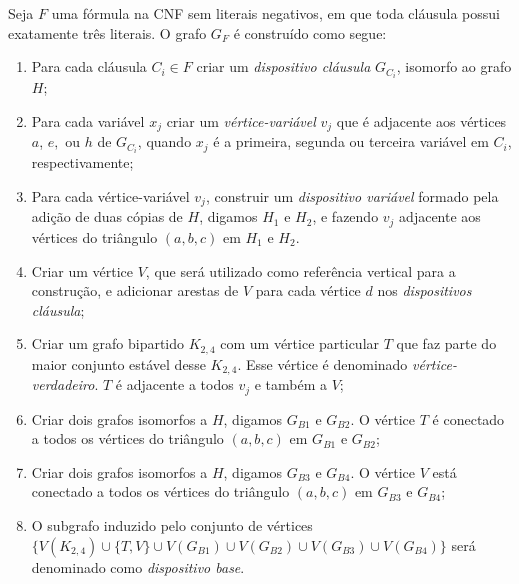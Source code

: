 \begin{definition}\label{sec:reducao}
Seja $F$ uma fórmula na CNF sem literais negativos, em que toda cláusula possui exatamente três literais. O grafo $G_F$ é construído como segue:

\begin{enumerate}
\item Para cada cláusula $C_i \in F$ criar um \textit{dispositivo cláusula} $G_{C_i}$, isomorfo ao grafo $H$;

\item Para cada variável $x_{j}$ criar um \emph{vértice-variável} $v_{j}$ que é adjacente aos vértices $a$, $e,$ ou $h$ de $G_{C_i}$, quando $x_{j}$ é a primeira, segunda ou terceira variável em $C_i$, respectivamente;

\item Para cada vértice-variável $v_{j}$, construir um \emph{dispositivo variável} formado pela adição de duas cópias de  $H$, digamos $H_1$ e $H_2$, e fazendo $v_j$ adjacente aos vértices do triângulo $(a, b, c)$ em  $H_1$ e $H_2$.



\item Criar um vértice $V$, que será utilizado como referência vertical para a construção, e adicionar arestas de  $V$ para cada vértice  $d$ nos \emph{dispositivos cláusula};%

\item Criar um grafo bipartido $K_{2,4}$ com um vértice particular $T$ que faz parte do maior conjunto estável desse $K_{2,4}$. Esse vértice é denominado \emph{vértice-verdadeiro}. $T$ é adjacente a todos  $v_{j}$ e também a $V$;

\item Criar dois grafos isomorfos a $H$, digamos $G_{B1}$ e $G_{B2}$. O vértice $T$ é conectado a todos os vértices do triângulo $(a,b,c)$
em $G_{B1}$ e $G_{B2}$;


\item Criar dois grafos isomorfos a $H$, digamos $G_{B3}$ e $G_{B4}$. O vértice $V$ está conectado a todos os vértices do triângulo $(a,b,c)$ em $G_{B3}$ e $G_{B4}$;

\item O subgrafo induzido pelo conjunto de vértices $\{V(K_{2,4}) \cup  \{T, V\} \cup V(G_{B1}) \cup V(G_{B2}) \cup V(G_{B3}) \cup V(G_{B4})\}$ será denominado como \emph{dispositivo base}. 
\end{enumerate}
\end{definition}


